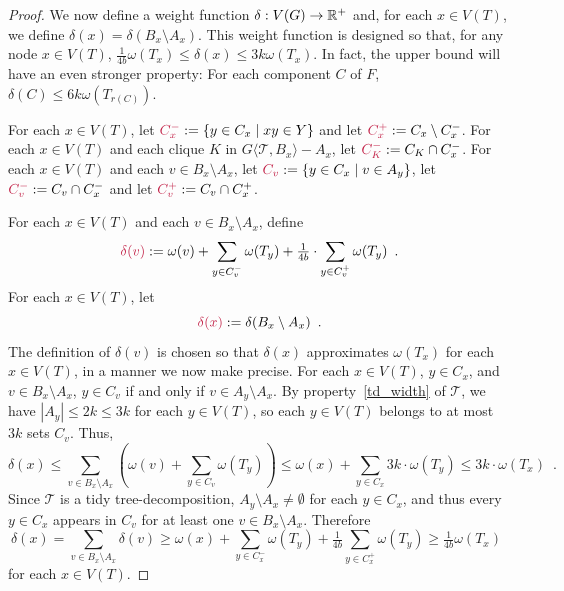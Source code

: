 \documentclass{patmorin}
\makeatletter
\renewcommand{\ge}{\geqslant}
\renewcommand{\le}{\leqslant}
\def\mathcolor#1#{\@mathcolor{#1}}
\def\@mathcolor#1#2#3{%
  \protect\leavevmode
  \begingroup
    \color#1{#2}#3%
  \endgroup
}
\newcommand{\mathdefin}[1]{\mathcolor{brightmaroon}{#1}}
\newcommand{\torso}[2]{{#1}\langle{#2}\rangle}
\newcommand{\calT}{\mathcal{T}}
\makeatother
\begin{document}
\begin{proof}
  We now define a weight function $\delta:V(G)\to\mathbb{R}^+$ and, for each $x\in V(T)$, we define $\delta(x)=\delta(B_x\setminus A_x)$.  This weight function is designed so that, for any node $x\in V(T)$, $\tfrac{1}{4b}\omega(T_x)\le \delta(x)\le 3k\omega(T_x)$.  In fact, the upper bound will have an even stronger property:  For each component $C$ of $F$, $\delta(C)\le 6k\omega(T_{r(C)})$.  
  
  
  For each $x\in V(T)$, let $\mathdefin{C^-_x}:=\{y\in C_x\mid xy\in Y\}$ and let $\mathdefin{C^+_x}:=C_x\setminus C^-_x$.  For each $x\in V(T)$ and each clique $K$ in $\torso{G}{\calT,B_x}-A_x$, let $\mathdefin{C^-_K}:=C_K\cap C^-_x$. For each $x\in V(T)$ and each $v\in B_x\setminus A_x$, let $\mathdefin{C_v}:=\{y\in C_x\mid v\in A_y\}$, let $\mathdefin{C^-_v}:=C_v\cap C^-_x$ and let $\mathdefin{C^+_v}:=C_v\cap C^+_x$.  
  
  For each $x\in V(T)$ and each $v\in B_x\setminus A_x$, define 
  \[
    \mathdefin{\delta(v)} := \omega(v)+\sum_{y\in C^-_v} \omega(T_y) + \tfrac{1}{4b}\cdot\sum_{y\in C^+_v}\omega(T_y) \enspace .
  \]
  For each $x\in V(T)$, let 
  \[
    \mathdefin{\delta(x)}:=\delta(B_x\setminus A_x) \enspace . 
  \]
  The definition of $\delta(v)$ is chosen so that $\delta(x)$ approximates $\omega(T_x)$ for each $x\in V(T)$, in a manner we now make precise.
  For each $x\in V(T)$, $y\in C_x$, and $v\in B_x\setminus A_x$, $y\in C_v$ if and only if $v\in A_y\setminus A_x$.  By property~\ref{td_width} of $\calT$, we have $|A_y|\le 2k\le 3k$ for each $y\in V(T)$, so each $y\in V(T)$ belongs to at most $3k$ sets $C_v$. Thus, 
  \begin{equation}
    \delta(x) 
    \le  \sum_{v\in B_x\setminus A_x}\left(\omega(v)+ \sum_{y\in C_v} \omega(T_y) \right) 
    \le \omega(x) + \sum_{y\in C_x} 3k\cdot\omega(T_y) \le 3k\cdot\omega(T_x) \enspace .
    \label{delta_x_upper_bound}
  \end{equation}
  Since $\calT$ is a tidy tree-decomposition, $A_y\setminus A_x\neq\emptyset$ for each $y\in C_x$, and thus every $y \in C_x$ appears in $C_v$ for at least one $v \in B_x \setminus A_x$.  Therefore
  \begin{equation}
    \delta(x) = \sum_{v\in B_x\setminus A_x}\delta(v) \ge \omega(x) + \sum_{y\in C^-_x} \omega(T_y) + \tfrac{1}{4b}\sum_{y\in C^+_x} \omega(T_y)
    \ge \tfrac{1}{4b}\omega(T_x) \enspace \label{delta_x_lower_bound}
  \end{equation}
  for each $x\in V(T)$.


\end{proof}
\end{document}
